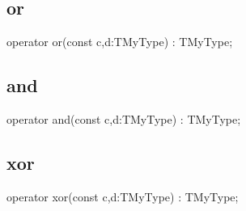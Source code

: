 \documentclass{report}
\begin{document}
\subsection*{or}
\begin{list}{}{
\setlength{\itemindent}{0cm}
\setlength{\listparindent}{0cm}
\setlength{\leftmargin}{\evensidemargin}
\addtolength{\leftmargin}{\tmplength}
\settowidth{\labelsep}{X}
\addtolength{\leftmargin}{\labelsep}
\setlength{\labelwidth}{\tmplength}
}
\begin{flushleft}
\item[\textbf{Declaration}\hfill]
\begin{ttfamily}
operator or(const c,d:TMyType) : TMyType;\end{ttfamily}


\end{flushleft}
\end{list}
\subsection*{and}
\begin{list}{}{
\setlength{\itemindent}{0cm}
\setlength{\listparindent}{0cm}
\setlength{\leftmargin}{\evensidemargin}
\addtolength{\leftmargin}{\tmplength}
\settowidth{\labelsep}{X}
\addtolength{\leftmargin}{\labelsep}
\setlength{\labelwidth}{\tmplength}
}
\begin{flushleft}
\item[\textbf{Declaration}\hfill]
\begin{ttfamily}
operator and(const c,d:TMyType) : TMyType;\end{ttfamily}


\end{flushleft}
\end{list}
\subsection*{xor}
\begin{list}{}{
\setlength{\itemindent}{0cm}
\setlength{\listparindent}{0cm}
\setlength{\leftmargin}{\evensidemargin}
\addtolength{\leftmargin}{\tmplength}
\settowidth{\labelsep}{X}
\addtolength{\leftmargin}{\labelsep}
\setlength{\labelwidth}{\tmplength}
}
\begin{flushleft}
\item[\textbf{Declaration}\hfill]
\begin{ttfamily}
operator xor(const c,d:TMyType) : TMyType;\end{ttfamily}


\end{flushleft}
\end{list}
\end{document}
